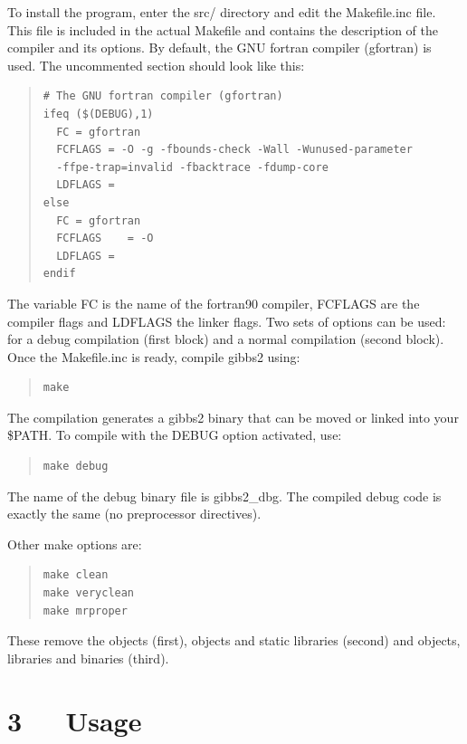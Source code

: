 \documentclass[a4paper]{article}
\begin{document}
To install the program, enter the src/ directory and edit the
Makefile.inc file. This file is included in the actual Makefile and
contains the description of the compiler and its options. By default,
the GNU fortran compiler (gfortran) is used. The uncommented section
should look like this:
%
\begin{quote}
\begin{verbatim}
# The GNU fortran compiler (gfortran)
ifeq ($(DEBUG),1)
  FC = gfortran
  FCFLAGS = -O -g -fbounds-check -Wall -Wunused-parameter
  -ffpe-trap=invalid -fbacktrace -fdump-core
  LDFLAGS =
else
  FC = gfortran
  FCFLAGS    = -O
  LDFLAGS =
endif
\end{verbatim}
\end{quote}

The variable FC is the name of the fortran90 compiler, FCFLAGS are the
compiler flags and LDFLAGS the linker flags. Two sets of options can
be used: for a debug compilation (first block) and a normal
compilation (second block). Once the Makefile.inc is ready, compile
gibbs2 using:
%
\begin{quote}
\begin{verbatim}
make
\end{verbatim}
\end{quote}

The compilation generates a gibbs2 binary that can be moved or linked
into your \$PATH. To compile with the DEBUG option activated, use:
%
\begin{quote}
\begin{verbatim}
make debug
\end{verbatim}
\end{quote}

The name of the debug binary file is gibbs2\_dbg. The compiled debug
code is exactly the same (no preprocessor directives).

Other make options are:
%
\begin{quote}
\begin{verbatim}
make clean
make veryclean
make mrproper
\end{verbatim}
\end{quote}

These remove the objects (first), objects and static libraries
(second) and objects, libraries and binaries (third).


\section{3~~~Usage%
  \label{usage}%
}
\end{document}
